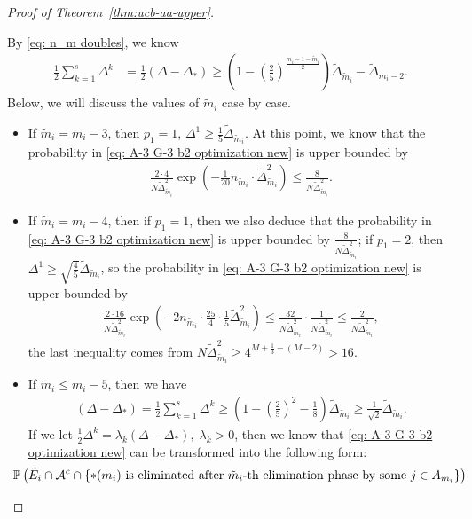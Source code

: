 \documentclass[
  12pt]{article}
\begin{document}
\begin{proof}[Proof of Theorem~\ref{thm:ucb-aa-upper}]
\begin{itemize}
By \eqref{eq: n_m doubles}, we know
\begin{align*}
    \frac{1}{2}\sum _{k=1}^{s}\Delta^k&=\frac{1}{2} \left(\Delta-\Delta_*\right)\geq \left(1-\left(\frac{2}{5}\right)^{\frac{m_i-1-\tilde{m}_i}{2}}\right)\tilde{\Delta}_{\tilde{m}_i}-\tilde{\Delta}_{m_i-2}.
\end{align*}
Below, we will discuss the values of $\tilde{m}_i$ case by case.
\begin{itemize}
    \item If  $\tilde{m}_i=m_i-3$, then $p_1=1$, $\Delta^1\geq \frac{1}{5}\tilde{\Delta}_{\tilde{m}_i}$. At this point, we know that the probability in \eqref{eq: A-3 G-3 b2 optimization new} is upper bounded by
    \begin{align*}
        \frac{2\cdot 4}{N\tilde{\Delta}_{\tilde{m}_i}^2}\exp\left(-\frac{1}{20}n_{\tilde{m}_i}\cdot \tilde{\Delta}_{\tilde{m}_i}^2\right)\leq \frac{8}{N\tilde{\Delta}_{\tilde{m}_i}^2}.
    \end{align*}
    \item If $\tilde{m}_i=m_i-4$, then if $p_1=1$, then we also deduce that the probability in \eqref{eq: A-3 G-3 b2 optimization new} is upper bounded by $\frac{8}{N\tilde{\Delta}_{\tilde{m}_i}^2}$; if $p_1=2$, then $\Delta^1\geq \sqrt{\frac{4}{5}}\tilde{\Delta}_{\tilde{m}_i}$, so the probability in \eqref{eq: A-3 G-3 b2 optimization new} is upper bounded by
\begin{align*}
        \frac{2\cdot 16}{N\tilde{\Delta}_{\tilde{m}_i}^2}\exp\left(-2n_{\tilde{m}_i}\cdot \frac{25}{4}\cdot \frac{1}{5}\tilde{\Delta}_{\tilde{m}_i}^2\right)\leq \frac{32}{N\tilde{\Delta}_{\tilde{m}_i}^2}\cdot \frac{1}{N\tilde{\Delta}_{\tilde{m}_i}^2}\leq \frac{2}{N\tilde{\Delta}_{\tilde{m}_i}^2},
    \end{align*}
    the last inequality comes from $ N\tilde{\Delta}_{\tilde{m}_i}^2\geq 4^{M+\frac{1}{3}-(M-2)}>16$.
\item If $\tilde{m}_i\leq m_i-5$, then we have
\begin{align*}
    (\Delta-\Delta_*)=\frac{1}{2}\sum _{k=1}^{s}\Delta^k\geq \left(1-\left(\frac{2}{5}\right)^{2}-\frac{1}{8}\right)\tilde{\Delta}_{\tilde{m}_i}\geq \frac{1}{\sqrt{2}}\tilde{\Delta}_{\tilde{m}_i}.
\end{align*}
If we let $\frac{1}{2}\Delta^k=\lambda_k(\Delta-\Delta_*),\; \lambda_k>0$, then we know that \eqref{eq: A-3 G-3 b2 optimization new} can be transformed into the following form:
 \begin{align}
&\!\!\!\!\!\!\!\!\!\!\!\!\!\!\!\!\;\;\;\;\;\mathbb{P}\left(\tilde{E}_i\cap\mathcal{A}^c\cap\left\{\text{$*(m_i)$ is eliminated after $\tilde{m}_i$-th elimination phase } \text{by some }j\in A_{m_i}\right\}\right)\notag\\

\end{align}
\end{itemize}
\end{itemize}
\end{proof}
\end{document}
